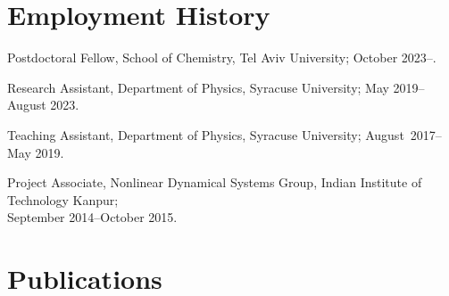 \documentclass[10pt,a4paper,article,oneside]{memoir}
\def\bname{\underline{Manu Mannattil}}    %
\begin{document}
\section{Employment History}

Postdoctoral Fellow, School of Chemistry, Tel Aviv University; October 2023--.

Research Assistant, Department of Physics, Syracuse University; May 2019--August 2023.

Teaching Assistant, Department of Physics, Syracuse University; August~2017--May 2019.

Project Associate, Nonlinear Dynamical Systems Group, Indian Institute of Technology Kanpur;\\ September 2014--October 2015.


\section{Publications}





\end{document}
